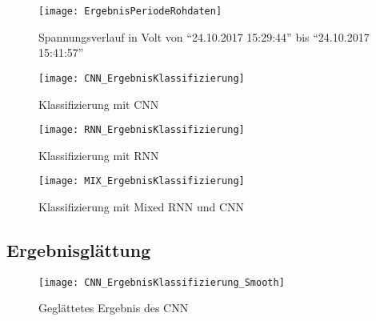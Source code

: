         \begin{figure}[H]
            \centering
            \texttt{[image: ErgebnisPeriodeRohdaten]}
            \caption{Spannungsverlauf in Volt von "`24.10.2017 15:29:44"' bis "`24.10.2017 15:41:57"'}
            \label{fig:ResultClassificationPeriod}
        \end{figure}

        \begin{figure}[H]
            \centering
            \texttt{[image: CNN\_ErgebnisKlassifizierung]}
            \caption{Klassifizierung mit CNN}
            \label{fig:CNN_RawClassification}
        \end{figure}

        \begin{figure}[H]
            \centering
            \texttt{[image: RNN\_ErgebnisKlassifizierung]}
            \caption{Klassifizierung mit RNN}
            \label{fig:RNN_RawClassification}
        \end{figure}

        \begin{figure}[H]
            \centering
            \texttt{[image: MIX\_ErgebnisKlassifizierung]}
            \caption{Klassifizierung mit Mixed RNN und CNN}
            \label{fig:MIX_RawClassification}
        \end{figure}

    \subsection{Ergebnisglättung}

        \begin{figure}[H]
            \centering
            \texttt{[image: CNN\_ErgebnisKlassifizierung\_Smooth]}
            \caption{Geglättetes Ergebnis des CNN}
            \label{fig:CNN_SmoothClassification}
        \end{figure}